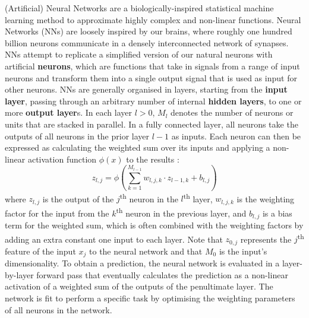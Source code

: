 (Artificial) Neural Networks are a biologically-inspired statistical machine learning method to approximate highly complex and non-linear functions. Neural Networks (NNs) are loosely inspired by our brains, where roughly one hundred billion neurons \cite{machine-learning-1997} communicate in a densely interconnected network of synapses. NNs attempt to replicate a simplified version of our natural neurons with artificial \textbf{neurons}, which are functions that take in signals from a range of input neurons and transform them into a single output signal that is used as input for other neurons. NNs are generally organised in layers, starting from the \textbf{input layer}, passing through an arbitrary number of internal \textbf{hidden layers}, to one or more \textbf{output layer}s. In each layer $l > 0$, $M_l$ denotes the number of neurons or units that are stacked in parallel. In a fully connected layer, all neurons take the outputs of all neurons in the prior layer $l-1$ as inputs. Each neuron can then be expressed as calculating the weighted sum over its inputs and applying a non-linear activation function $\phi(x)$ to the results \cite{rio-2019}:
\begin{equation*}
    z_{l, j} = \phi \left( \sum_{k=1}^{M_{l-1}}{w_{l,j,k} \cdot z_{l-1,k} + b_{l,j}} \right)
\end{equation*}
where $z_{l, j}$ is the output of the $j$\textsuperscript{th} neuron in the $l$\textsuperscript{th} layer, $w_{l,j,k}$ is the weighting factor for the input from the $k$\textsuperscript{th} neuron in the previous layer, and $b_{l,j}$ is a bias term for the weighted sum, which is often combined with the weighting factors by adding an extra constant one input to each layer. Note that $z_{0, j}$ represents the $j$\textsuperscript{th} feature of the input $x_j$ to the neural network and that $M_0$ is the input's dimensionality. To obtain a prediction, the neural network is evaluated in a layer-by-layer forward pass that eventually calculates the prediction as a non-linear activation of a weighted sum of the outputs of the penultimate layer. The network is fit to perform a specific task by optimising the weighting parameters of all neurons in the network.

